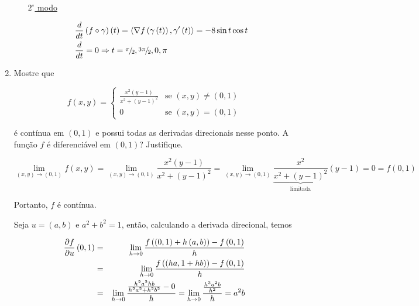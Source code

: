 \documentclass[11pt, oneside, a4paper]{gsm-l}
\begin{document}
\begin{enumerate}
\begin{sol}
\begin{enumerate}[(a)]
\uline{$2^\circ$ modo}

\[
\begin{gathered}
  \frac{d}
{{dt}}\left( {f \circ \gamma } \right)\left( t \right) = \left\langle {\nabla f\left( {\gamma \left( t \right)} \right),\gamma '\left( t \right)} \right\rangle  =  - 8\sin t\cos t \hfill \\
  \frac{d}
{{dt}} = 0 \Rightarrow t = {\raise0.5ex\hbox{$\scriptstyle \pi $}
\kern-0.1em/\kern-0.15em
\lower0.25ex\hbox{$\scriptstyle 2$}},{\raise0.5ex\hbox{$\scriptstyle {3\pi }$}
\kern-0.1em/\kern-0.15em
\lower0.25ex\hbox{$\scriptstyle 2$}},0,\pi  \hfill \\
\end{gathered}
\]


\end{enumerate}
\end{sol}

\item Mostre que

\begin{equation*}
f(x,y) = \left\{ \begin{array}{cl}\displaystyle
        \frac{{x^2(y-1)}}{{x^2 + (y-1)^2}} & \textrm{se }\left( {x,y} \right) \ne \left( {0,1} \right)\\
        0 & \textrm{se }\left( {x,y} \right) = \left( {0,1} \right)\end{array}\right.
\end{equation*}

é contínua em $(0,1)$ e possui todas as derivadas direcionais nesse ponto. A fun\c{c}ão $f$ é diferenciável em $(0,1)$? Justifique.

\begin{sol}
\[
\scriptstyle{
\mathop {\lim }\limits_{\left( {x,y} \right) \to \left( {0,1} \right)} f\left( {x,y} \right) = \mathop {\lim }\limits_{\left( {x,y} \right) \to \left( {0,1} \right)} \frac{{x^2 \left( {y - 1} \right)}}
{{x^2  + \left( {y - 1} \right)^2 }} = \mathop {\lim }\limits_{\left( {x,y} \right) \to \left( {0,1} \right)} \underbrace {\scriptstyle{\frac{x^2}{x^2  + \left( {y - 1} \right)^2}}}_{{\text{limitada}}}\left( {y - 1} \right) = 0 = f\left( {0,1} \right)
}
\]

Portanto, $f$ é contínua.

Seja $u=(a,b)$ e $a^2+b^2=1$, então, calculando a derivada direcional, temos


\begin{eqnarray*}
  \frac{{\partial f}}{{\partial u}}\left( {0,1} \right) &=& \mathop {\lim }\limits_{h \to 0} \frac{{f\left( {\left( {0,1} \right) + h\left( {a,b} \right)} \right) - f\left( {0,1} \right)}}{h} \hfill \\
   &=& \mathop {\lim }\limits_{h \to 0} \frac{{f\left( {\left( {ha,1 + hb} \right)} \right) - f\left( {0,1} \right)}}{h} \hfill \\
   &=& \mathop {\lim }\limits_{h \to 0} \frac{{\frac{{h^2 a^2 hb}}{{h^2 a^2  + h^2 b^2 }} - 0}}{h} = \mathop {\lim }\limits_{h \to 0} \frac{{\frac{{h^3 a^2 b}}{{h^2 }}}}{h} = a^2 b \hfill \\
\end{eqnarray*}


\end{sol}
\end{enumerate}
\end{document}
